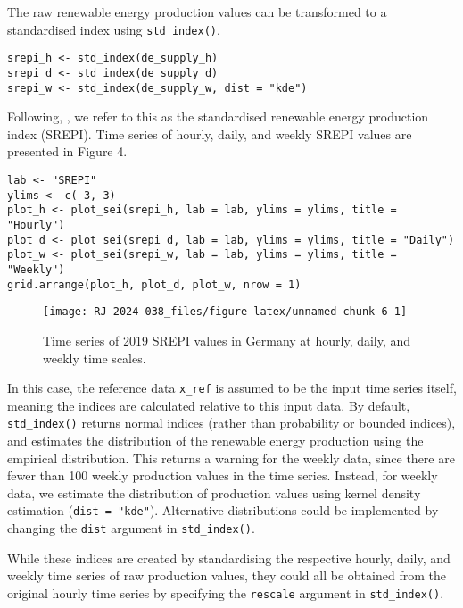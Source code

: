The raw renewable energy production values can be transformed to a standardised index using \texttt{std\_index()}.

\begin{verbatim}
srepi_h <- std_index(de_supply_h)
srepi_d <- std_index(de_supply_d)
srepi_w <- std_index(de_supply_w, dist = "kde")
\end{verbatim}

Following, \cite{AllenOtero2023}, we refer to this as the standardised renewable energy production index (SREPI). Time series of hourly, daily, and weekly SREPI values are presented in Figure 4.

\begin{verbatim}
lab <- "SREPI"
ylims <- c(-3, 3)
plot_h <- plot_sei(srepi_h, lab = lab, ylims = ylims, title = "Hourly")
plot_d <- plot_sei(srepi_d, lab = lab, ylims = ylims, title = "Daily")
plot_w <- plot_sei(srepi_w, lab = lab, ylims = ylims, title = "Weekly")
grid.arrange(plot_h, plot_d, plot_w, nrow = 1)
\end{verbatim}

\begin{figure}

{\centering \texttt{[image: RJ-2024-038\_files/figure-latex/unnamed-chunk-6-1]} 

}

\caption{Time series of 2019 SREPI values in Germany at hourly, daily, and weekly time scales.}\label{fig:unnamed-chunk-6}
\end{figure}

In this case, the reference data \texttt{x\_ref} is assumed to be the input time series itself, meaning the indices are calculated relative to this input data. By default, \texttt{std\_index()} returns normal indices (rather than probability or bounded indices), and estimates the distribution of the renewable energy production using the empirical distribution. This returns a warning for the weekly data, since there are fewer than 100 weekly production values in the time series. Instead, for weekly data, we estimate the distribution of production values using kernel density estimation (\texttt{dist\ =\ "kde"}). Alternative distributions could be implemented by changing the \texttt{dist} argument in \texttt{std\_index()}.

While these indices are created by standardising the respective hourly, daily, and weekly time series of raw production values, they could all be obtained from the original hourly time series by specifying the \texttt{rescale} argument in \texttt{std\_index()}.


